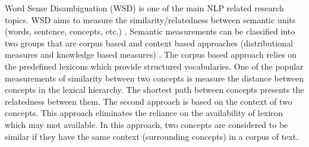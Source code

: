 \documentclass[Journal, InsideFigs, DoubleSpace]{ascelike} %
\begin{document}

Word Sense Disambiguation (WSD) is one of the main NLP related research topics. WSD aims to measure the similarity/relatedness between semantic units (words, sentence, concepts, etc.) \cite{harispe15}. Semantic measurements can be classified into two groups that are corpus based and context based approaches (distributional measures and knowledge based measures) \cite{Harispe13}. The corpus based approach relies on the predefined lexicons which provide structured vocabularies. One of the popular measurements of similarity between two concepts is measure the distance between concepts in the lexical hierarchy. The shortest path between concepts presents the relatedness between them. The second approach is based on the context of two concepts. This approach eliminates the reliance on the availability of lexicon which may mot available. In this approach, two concepts are considered to be similar if they have the same context (surrounding concepts) in a corpus of text.



\end{document}
